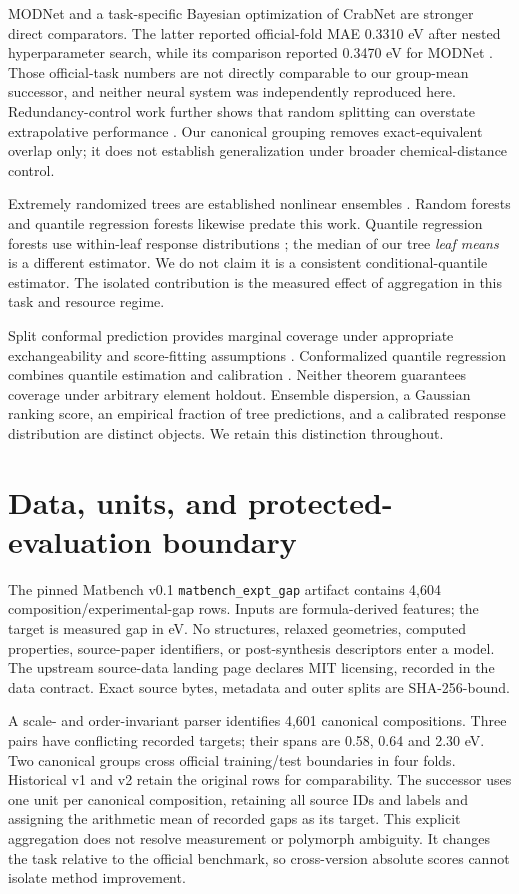 \documentclass[11pt]{article}
\begin{document}
MODNet and a task-specific Bayesian optimization of CrabNet are stronger direct comparators. The latter reported official-fold MAE 0.3310 eV after nested hyperparameter search, while its comparison reported 0.3470 eV for MODNet \cite{debreuck2021modnet,baird2022saasbo}. Those official-task numbers are not directly comparable to our group-mean successor, and neither neural system was independently reproduced here. Redundancy-control work further shows that random splitting can overstate extrapolative performance \cite{li2024mdhit}. Our canonical grouping removes exact-equivalent overlap only; it does not establish generalization under broader chemical-distance control.

Extremely randomized trees are established nonlinear ensembles \cite{geurts2006extratrees}. Random forests and quantile regression forests likewise predate this work. Quantile regression forests use within-leaf response distributions \cite{meinshausen2006qrf}; the median of our tree \emph{leaf means} is a different estimator. We do not claim it is a consistent conditional-quantile estimator. The isolated contribution is the measured effect of aggregation in this task and resource regime.

Split conformal prediction provides marginal coverage under appropriate exchangeability and score-fitting assumptions \cite{lei2018conformal}. Conformalized quantile regression combines quantile estimation and calibration \cite{romano2019cqr}. Neither theorem guarantees coverage under arbitrary element holdout. Ensemble dispersion, a Gaussian ranking score, an empirical fraction of tree predictions, and a calibrated response distribution are distinct objects. We retain this distinction throughout.

\section{Data, units, and protected-evaluation boundary}
The pinned Matbench v0.1 \texttt{matbench\_expt\_gap} artifact contains 4,604 composition/experimental-gap rows. Inputs are formula-derived features; the target is measured gap in eV. No structures, relaxed geometries, computed properties, source-paper identifiers, or post-synthesis descriptors enter a model. The upstream source-data landing page declares MIT licensing, recorded in the data contract. Exact source bytes, metadata and outer splits are SHA-256-bound.

A scale- and order-invariant parser identifies 4,601 canonical compositions. Three pairs have conflicting recorded targets; their spans are 0.58, 0.64 and 2.30 eV. Two canonical groups cross official training/test boundaries in four folds. Historical v1 and v2 retain the original rows for comparability. The successor uses one unit per canonical composition, retaining all source IDs and labels and assigning the arithmetic mean of recorded gaps as its target. This explicit aggregation does not resolve measurement or polymorph ambiguity. It changes the task relative to the official benchmark, so cross-version absolute scores cannot isolate method improvement.
\end{document}
